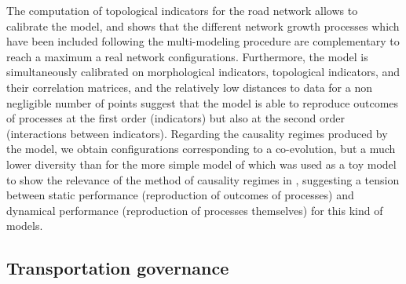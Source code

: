 \documentclass[11pt]{article}
\begin{document}
The computation of topological indicators for the road network allows to calibrate the model, and \cite{raimbault2018multi} shows that the different network growth processes which have been included following the multi-modeling procedure are complementary to reach a maximum a real network configurations. Furthermore, the model is simultaneously calibrated on morphological indicators, topological indicators, and their correlation matrices, and the relatively low distances to data for a non negligible number of points suggest that the model is able to reproduce outcomes of processes at the first order (indicators) but also at the second order (interactions between indicators). Regarding the causality regimes produced by the model, we obtain configurations corresponding to a co-evolution, but a much lower diversity than for the more simple model of \cite{raimbault2014hybrid} which was used as a toy model to show the relevance of the method of causality regimes in \cite{raimbault2017identification}, suggesting a tension between static performance (reproduction of outcomes of processes) and dynamical performance (reproduction of processes themselves) for this kind of models.
 
 

\subsection{Transportation governance}
 
\end{document}
